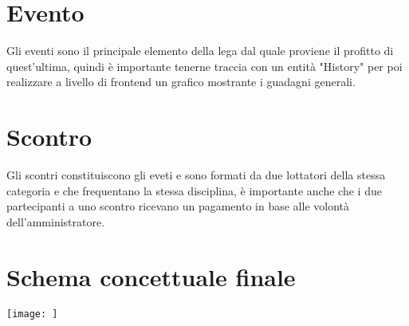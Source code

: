 \documentclass[a4paper,12pt]{report}
\begin{document}
\section{Evento}
Gli eventi sono il principale elemento della lega dal quale proviene il profitto di quest'ultima, quindi è importante 
tenerne traccia con un entità "History" per poi realizzare a livello di frontend un grafico mostrante i guadagni generali.

\section{Scontro}
Gli scontri constituiscono gli eveti e sono formati da due lottatori della stessa categoria e che frequentano la stessa 
disciplina, è importante anche che i due partecipanti a uno scontro ricevano un pagamento in base alle volontà dell'amministratore.

\section{Schema concettuale finale}
\texttt{[image: ]}
\end{document}

